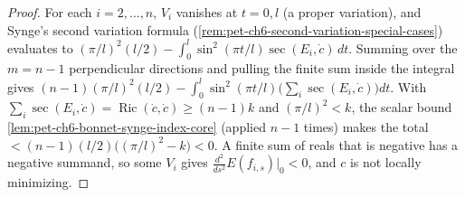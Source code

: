 \begin{proof}
  \leanok
  For each $i=2,\dots,n$, $V_i$ vanishes at $t=0,l$ (a proper variation), and Synge's second
  variation formula (\cref{rem:pet-ch6-second-variation-special-cases}) evaluates to
  $(\pi/l)^2(l/2)-\int_0^l\sin^2(\pi t/l)\sec(E_i,\dot c)\,dt$. Summing over the $m=n-1$
  perpendicular directions and pulling the finite sum inside the integral gives
  $(n-1)(\pi/l)^2(l/2)-\int_0^l\sin^2(\pi t/l)\big(\sum_i\sec(E_i,\dot c)\big)dt$. With
  $\sum_i\sec(E_i,\dot c)=\operatorname{Ric}(\dot c,\dot c)\ge(n-1)k$ and $(\pi/l)^2<k$, the
  scalar bound \cref{lem:pet-ch6-bonnet-synge-index-core} (applied $n-1$ times) makes the total
  $<(n-1)(l/2)\big((\pi/l)^2-k\big)<0$. A finite sum of reals that is negative has a negative
  summand, so some $V_i$ gives $\tfrac{d^2}{ds^2}E(f_{i,s})|_0<0$, and $c$ is not locally
  minimizing.
\end{proof}

